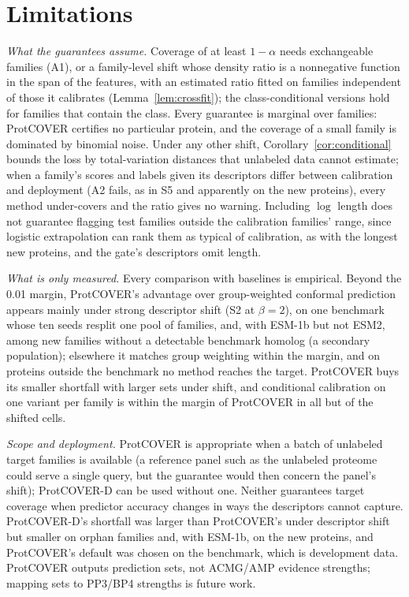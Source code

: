 \section{Limitations}\label{sec:limitations}

\emph{What the guarantees assume.} Coverage of at least $1-\alpha$ needs exchangeable families (A1), or a family-level shift whose density ratio is a nonnegative function in the span of the features, with an estimated ratio fitted on families independent of those it calibrates (Lemma~\ref{lem:crossfit}); the class-conditional versions hold for families that contain the class. Every guarantee is marginal over families: ProtCOVER certifies no particular protein, and the coverage of a small family is dominated by binomial noise. Under any other shift, Corollary~\ref{cor:conditional} bounds the loss by total-variation distances that unlabeled data cannot estimate; when a family's scores and labels given its descriptors differ between calibration and deployment (A2 fails, as in S5 and apparently on the new proteins), every method under-covers and the ratio gives no warning. Including $\log$ length does not guarantee flagging test families outside the calibration families' range, since logistic extrapolation can rank them as typical of calibration, as with the longest new proteins, and the gate's descriptors omit length.

\emph{What is only measured.} Every comparison with baselines is empirical. Beyond the 0.01 margin, ProtCOVER's advantage over group-weighted conformal prediction appears mainly under strong descriptor shift (S2 at $\beta=2$), on one benchmark whose ten seeds resplit one pool of families, and, with ESM-1b but not ESM2, among new families without a detectable benchmark homolog (a secondary population); elsewhere it matches group weighting within the margin, and on proteins outside the benchmark no method reaches the target. ProtCOVER buys its smaller shortfall with larger sets under shift, and conditional calibration on one variant per family is within the margin of ProtCOVER in all but \revSubBetter{} of the \revNCells{} shifted cells.

\emph{Scope and deployment.} ProtCOVER is appropriate when a batch of unlabeled target families is available (a reference panel such as the unlabeled proteome could serve a single query, but the guarantee would then concern the panel's shift); ProtCOVER-D can be used without one. Neither guarantees target coverage when predictor accuracy changes in ways the descriptors cannot capture. ProtCOVER-D's shortfall was larger than ProtCOVER's under descriptor shift but smaller on orphan families and, with ESM-1b, on the new proteins, and ProtCOVER's default was chosen on the benchmark, which is development data. ProtCOVER outputs prediction sets, not ACMG/AMP evidence strengths; mapping sets to PP3/BP4 strengths is future work.
